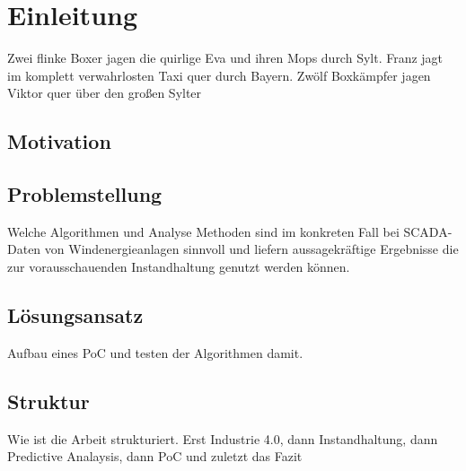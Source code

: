 \section{Einleitung}
Zwei flinke Boxer jagen die quirlige Eva und ihren Mops durch Sylt. Franz jagt im komplett verwahrlosten Taxi quer durch Bayern. Zwölf Boxkämpfer jagen Viktor quer über den großen Sylter

\subsection{Motivation}


\subsection{Problemstellung}
Welche Algorithmen und Analyse Methoden sind im konkreten Fall bei SCADA-Daten von Windenergieanlagen sinnvoll und liefern aussagekräftige Ergebnisse die zur vorausschauenden Instandhaltung genutzt werden können.

\subsection{Lösungsansatz}
Aufbau eines PoC und testen der Algorithmen damit.

\subsection{Struktur}
Wie ist die Arbeit strukturiert. Erst Industrie 4.0, dann Instandhaltung, dann Predictive Analaysis, dann PoC und zuletzt das Fazit

\newpage